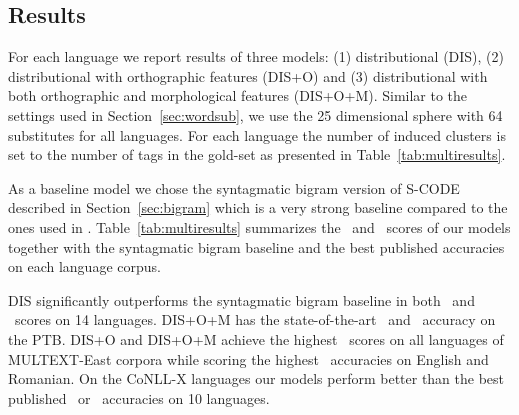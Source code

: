 \subsection{Results}
\label{sec:multires}

For each language we report results of three models: (1)
distributional (DIS), (2) distributional with orthographic features
(DIS+O) and (3) distributional with both orthographic and
morphological features (DIS+O+M).  Similar to the settings used in
Section~\ref{sec:wordsub}, we use the 25 dimensional sphere with 64
substitutes for all languages.  For each language the number of induced
clusters is set to the number of tags in the gold-set as presented in
Table~\ref{tab:multiresults}.

As a baseline model we chose the syntagmatic bigram version of S-CODE
described in Section~\ref{sec:bigram} which is a very strong baseline
compared to the ones used in
\cite{christodoulopoulos-goldwater-steedman:2011:EMNLP}.
Table~\ref{tab:multiresults} summarizes the \mto\ and \vm\ scores of
our models together with the syntagmatic bigram baseline and the best
published accuracies on each language corpus.

DIS significantly outperforms the syntagmatic bigram baseline in both
\mto\ and \vm\ scores on 14 languages.  DIS+O+M has the
state-of-the-art \mto\ and \vm\ accuracy on the PTB.  DIS+O and
DIS+O+M achieve the highest \mto\ scores on all languages of
MULTEXT-East corpora while scoring the highest \vm\ accuracies on
English and Romanian.  On the CoNLL-X languages our models perform
better than the best published \mto\ or \vm\ accuracies on 10
languages.

